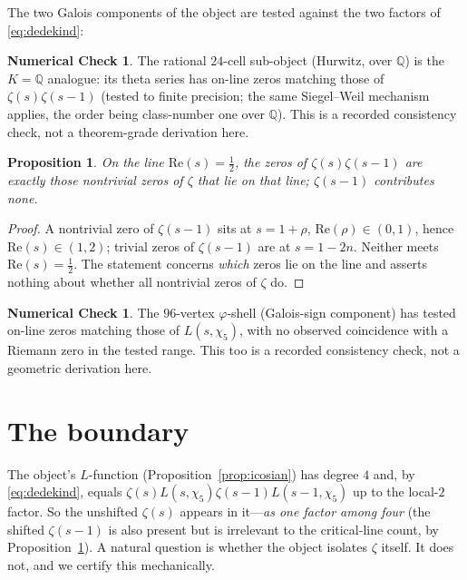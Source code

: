 \documentclass[11pt]{article}
\newtheorem{proposition}[theorem]{Proposition}
\theoremstyle{definition}
\newtheorem{numcheck}[theorem]{Numerical Check}
\newcommand{\Q}{\mathbb{Q}}
\begin{document}
The two Galois components of the object are tested against the two factors of
\eqref{eq:dedekind}:
\begin{numcheck}\label{res:24cell}
The rational $24$-cell sub-object (Hurwitz, over $\Q$) is the $K=\Q$ analogue: its theta
series has on-line zeros matching those of $\zeta(s)\zeta(s-1)$ (tested to finite
precision; the same Siegel--Weil mechanism applies, the order being class-number one
over $\Q$). This is a recorded consistency check, not a theorem-grade derivation here.
\end{numcheck}
\begin{proposition}\label{prop:online}
On the line $\mathrm{Re}(s)=\tfrac12$, the zeros of $\zeta(s)\zeta(s-1)$ are exactly
those nontrivial zeros of $\zeta$ that lie on that line; $\zeta(s-1)$ contributes none.
\end{proposition}
\begin{proof}
A nontrivial zero of $\zeta(s-1)$ sits at $s=1+\rho$, $\mathrm{Re}(\rho)\in(0,1)$, hence
$\mathrm{Re}(s)\in(1,2)$; trivial zeros of $\zeta(s-1)$ are at $s=1-2n$. Neither meets
$\mathrm{Re}(s)=\tfrac12$. The statement concerns \emph{which} zeros lie on the line and
asserts nothing about whether all nontrivial zeros of $\zeta$ do.
\end{proof}
\begin{numcheck}\label{res:twin}
The $96$-vertex $\varphi$-shell (Galois-sign component) has tested on-line zeros matching
those of $L(s,\chi_5)$, with no observed coincidence with a Riemann zero in the tested
range. This too is a recorded consistency check, not a geometric derivation here.
\end{numcheck}

\section{The boundary}\label{sec:boundary}
The object's $L$-function (Proposition~\ref{prop:icosian}) has degree $4$ and, by
\eqref{eq:dedekind}, equals $\zeta(s)L(s,\chi_5)\zeta(s-1)L(s-1,\chi_5)$ up to the
local-$2$ factor. So the unshifted $\zeta(s)$ appears in it---\emph{as one factor among
four} (the shifted $\zeta(s-1)$ is also present but is irrelevant to the critical-line
count, by Proposition~\ref{prop:online}). A natural question is whether the object
isolates $\zeta$ itself. It does not, and we certify this mechanically.
\end{document}
